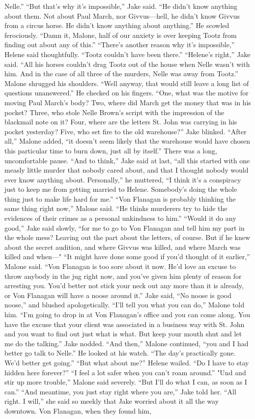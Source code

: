 \documentclass{novel}
\begin{document}
Nelle.” “But that’s why it’s impossible,” Jake said. “He didn’t know anything about them. Not about Paul March, nor Givvus—hell, he didn’t know Givvus from a circus horse. He didn’t know anything about anything.” He scowled ferociously. “Damn it, Malone, half of our anxiety is over keeping Tootz from finding out about any of this.” “There’s another reason why it’s impossible,” Helene said thoughtfully. “Tootz couldn’t have been there.” “Helene’s right,” Jake said. “All his horses couldn’t drag Tootz out of the house when Nelle wasn’t with him. And in the case of all three of the murders, Nelle was away from Tootz.” Malone shrugged his shoulders. “Well anyway, that would still leave a long list of questions unanswered.” He checked on his fingers. “One, what was the motive for moving Paul March’s body? Two, where did March get the money that was in his pocket? Three, who stole Nelle Brown’s script with the impression of the blackmail note on it? Four, where are the letters St. John was carrying in his pocket yesterday? Five, who set fire to the old warehouse?” Jake blinked. “After all,” Malone added, “it doesn’t seem likely that the warehouse would have chosen this particular time to burn down, just all by itself.” There was a long, uncomfortable pause. “And to think,” Jake said at last, “all this started with one measly little murder that nobody cared about, and that I thought nobody would ever know anything about. Personally,” he muttered, “I think it’s a conspiracy just to keep me from getting married to Helene. Somebody’s doing the whole thing just to make life hard for me.” “Von Flanagan is probably thinking the same thing right now,” Malone said. “He thinks murderers try to hide the evidences of their crimes as a personal unkindness to him.” “Would it do any good,” Jake said slowly, “for me to go to Von Flanagan and tell him my part in the whole mess? Leaving out the part about the letters, of course. But if he knew about the secret audition, and where Givvus was killed, and where March was killed and when—" “It might have done some good if you’d thought of it earlier,” Malone said. “Von Flanagan is too sore about it now. He’d love an excuse to throw anybody in the jug right now, and you’ve given him plenty of reason for arresting you. You’d better not stick your neck out any more than it is already, or Von Flanagan will have a noose around it.” Jake said, “No noose is good noose,” and blushed apologetically. “I’ll tell you what you can do,” Malone told him. “I’m going to drop in at Von Flanagan’s office and you can come along. You have the excuse that your client was associated in a business way with St. John and you want to find out just what is what. But keep your mouth shut and let me do the talking.” Jake nodded. “And then,” Malone continued, “you and I had better go talk to Nelle.” He looked at his watch. “The day’s practically gone. We’d better get going.” “But what about me?” Helene wailed. “Do I have to stay hidden here forever?” “I feel a lot safer when you can’t roam around.” "Und and stir up more trouble,” Malone said severely. “But I’ll do what I can, as soon as I can.” “And meantime, you just stay right where you are,” Jake told her. “All right. I will,” she said so meekly that Jake worried about it all the way downtown. Von Flanagan, when they found him, 
\end{document}
